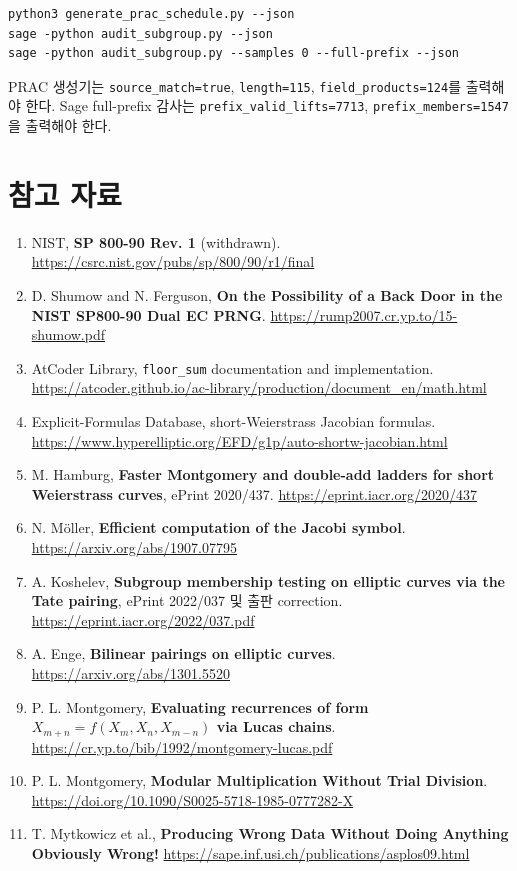 \documentclass[10pt,a4paper]{article}
\begin{document}
\begin{lstlisting}
python3 generate_prac_schedule.py --json
sage -python audit_subgroup.py --json
sage -python audit_subgroup.py --samples 0 --full-prefix --json
\end{lstlisting}

PRAC 생성기는 \texttt{source\_match=true},
\texttt{length=115}, \texttt{field\_products=124}를 출력해야 한다.
Sage full-prefix 감사는
\texttt{prefix\_valid\_lifts=7713},
\texttt{prefix\_members=1547}을 출력해야 한다.

\section{참고 자료}

\begingroup
\raggedright
\begin{enumerate}[leftmargin=6mm]
  \item NIST, \textbf{SP 800-90 Rev. 1} (withdrawn).
        \url{https://csrc.nist.gov/pubs/sp/800/90/r1/final}
  \item D. Shumow and N. Ferguson,
        \textbf{On the Possibility of a Back Door in the NIST SP800-90
        Dual EC PRNG}.
        \url{https://rump2007.cr.yp.to/15-shumow.pdf}
  \item AtCoder Library, \texttt{floor\_sum} documentation and
        implementation.
        \url{https://atcoder.github.io/ac-library/production/document_en/math.html}
  \item Explicit-Formulas Database,
        short-Weierstrass Jacobian formulas.
        \url{https://www.hyperelliptic.org/EFD/g1p/auto-shortw-jacobian.html}
  \item M. Hamburg,
        \textbf{Faster Montgomery and double-add ladders for short
        Weierstrass curves}, ePrint 2020/437.
        \url{https://eprint.iacr.org/2020/437}
  \item N. Möller, \textbf{Efficient computation of the Jacobi symbol}.
        \url{https://arxiv.org/abs/1907.07795}
  \item A. Koshelev,
        \textbf{Subgroup membership testing on elliptic curves via the
        Tate pairing}, ePrint 2022/037 및 출판 correction.
        \url{https://eprint.iacr.org/2022/037.pdf}
  \item A. Enge, \textbf{Bilinear pairings on elliptic curves}.
        \url{https://arxiv.org/abs/1301.5520}
  \item P. L. Montgomery,
        \textbf{Evaluating recurrences of form
        \(X_{m+n}=f(X_m,X_n,X_{m-n})\) via Lucas chains}.
        \url{https://cr.yp.to/bib/1992/montgomery-lucas.pdf}
  \item P. L. Montgomery,
        \textbf{Modular Multiplication Without Trial Division}.
        \url{https://doi.org/10.1090/S0025-5718-1985-0777282-X}
  \item T. Mytkowicz et al.,
        \textbf{Producing Wrong Data Without Doing Anything Obviously Wrong!}
        \url{https://sape.inf.usi.ch/publications/asplos09.html}
\end{enumerate}
\endgroup
\end{document}
